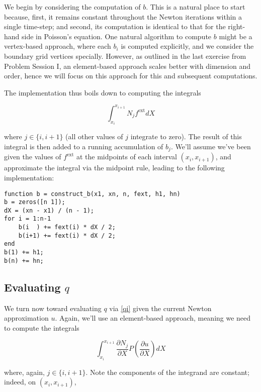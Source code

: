 \documentclass{article}
\begin{document}
We begin by considering the computation of \(b\).  This is a natural place to start because, first, it remains constant throughout the Newton iterations within a single time-step; and second, its computation is identical to that for the right-hand side in Poisson's equation.  One natural algorithm to compute \(b\) might be a vertex-based approach, where each \(b_i\) is computed explicitly, and we consider the boundary grid vertices specially.  However, as outlined in the last exercise from Problem Session I, an element-based approach scales better with dimension and order, hence we will focus on this approach for this and subsequent computations.

The implementation thus boils down to computing the integrals

\begin{equation}
\int_{x_i}^{x_{i+1}} N_j f^{\text{ext}} dX
\end{equation}

where \(j \in \{i, i+1\}\) (all other values of \(j\) integrate to zero).  The result of this integral is then added to a running accumulation of \(b_j\).  We'll assume we've been given the values of \(f^{\text{ext}}\) at the midpoints of each interval \((x_i, x_{i+1})\), and approximate the integral via the midpoint rule, leading to the following implementation:

\begin{verbatim}
function b = construct_b(x1, xn, n, fext, h1, hn)
b = zeros([n 1]);
dX = (xn - x1) / (n - 1);
for i = 1:n-1
    b(i  ) += fext(i) * dX / 2;
    b(i+1) += fext(i) * dX / 2;
end
b(1) += h1;
b(n) += hn;
\end{verbatim}

\subsection{Evaluating \(q\)}

We turn now toward evaluating \(q\) via \eqref{qi} given the current Newton approximation \(u\).  Again, we'll use an element-based approach, meaning we need to compute the integrals

\begin{equation}
\int_{x_i}^{x_{i+1}} \frac{\partial N_j}{\partial X} P \left( \frac{\partial u}{\partial X} \right) dX
\end{equation}

where, again, \(j \in \{i, i+1\}\).  Note the components of the integrand are constant; indeed, on \((x_i, x_{i+1})\),
\end{document}
